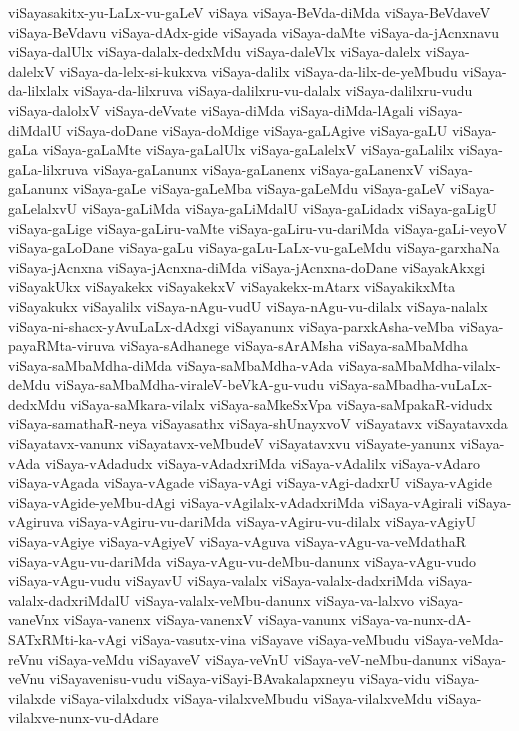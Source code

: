 {viSayasakitx-yu-LaLx-vu-gaLeV
viSaya
viSaya-BeVda-diMda
viSaya-BeVdaveV
viSaya-BeVdavu
viSaya-dAdx-gide
viSayada
viSaya-daMte
viSaya-da-jAcnxnavu
viSaya-dalUlx
viSaya-dalalx-dedxMdu
viSaya-daleVlx
viSaya-dalelx
viSaya-dalelxV
viSaya-da-lelx-si-kukxva
viSaya-dalilx
viSaya-da-lilx-de-yeMbudu
viSaya-da-lilxlalx
viSaya-da-lilxruva
viSaya-dalilxru-vu-dalalx
viSaya-dalilxru-vudu
viSaya-dalolxV
viSaya-deVvate
viSaya-diMda
viSaya-diMda-lAgali
viSaya-diMdalU
viSaya-doDane
viSaya-doMdige
viSaya-gaLAgive
viSaya-gaLU
viSaya-gaLa
viSaya-gaLaMte
viSaya-gaLalUlx
viSaya-gaLalelxV
viSaya-gaLalilx
viSaya-gaLa-lilxruva
viSaya-gaLanunx
viSaya-gaLanenx
viSaya-gaLanenxV
viSaya-gaLanunx
viSaya-gaLe
viSaya-gaLeMba
viSaya-gaLeMdu
viSaya-gaLeV
viSaya-gaLelalxvU
viSaya-gaLiMda
viSaya-gaLiMdalU
viSaya-gaLidadx
viSaya-gaLigU
viSaya-gaLige
viSaya-gaLiru-vaMte
viSaya-gaLiru-vu-dariMda
viSaya-gaLi-veyoV
viSaya-gaLoDane
viSaya-gaLu
viSaya-gaLu-LaLx-vu-gaLeMdu
viSaya-garxhaNa
viSaya-jAcnxna
viSaya-jAcnxna-diMda
viSaya-jAcnxna-doDane
viSayakAkxgi
viSayakUkx
viSayakekx
viSayakekxV
viSayakekx-mAtarx
viSayakikxMta
viSayakukx
viSayalilx
viSaya-nAgu-vudU
viSaya-nAgu-vu-dilalx
viSaya-nalalx
viSaya-ni-shacx-yAvuLaLx-dAdxgi
viSayanunx
viSaya-parxkAsha-veMba
viSaya-payaRMta-viruva
viSaya-sAdhanege
viSaya-sArAMsha
viSaya-saMbaMdha
viSaya-saMbaMdha-diMda
viSaya-saMbaMdha-vAda
viSaya-saMbaMdha-vilalx-deMdu
viSaya-saMbaMdha-viraleV-beVkA-gu-vudu
viSaya-saMbadha-vuLaLx-dedxMdu
viSaya-saMkara-vilalx
viSaya-saMkeSxVpa
viSaya-saMpakaR-vidudx
viSaya-samathaR-neya
viSayasathx
viSaya-shUnayxvoV
viSayatavx
viSayatavxda
viSayatavx-vanunx
viSayatavx-veMbudeV
viSayatavxvu
viSayate-yanunx
viSaya-vAda
viSaya-vAdadudx
viSaya-vAdadxriMda
viSaya-vAdalilx
viSaya-vAdaro
viSaya-vAgada
viSaya-vAgade
viSaya-vAgi
viSaya-vAgi-dadxrU
viSaya-vAgide
viSaya-vAgide-yeMbu-dAgi
viSaya-vAgilalx-vAdadxriMda
viSaya-vAgirali
viSaya-vAgiruva
viSaya-vAgiru-vu-dariMda
viSaya-vAgiru-vu-dilalx
viSaya-vAgiyU
viSaya-vAgiye
viSaya-vAgiyeV
viSaya-vAguva
viSaya-vAgu-va-veMdathaR
viSaya-vAgu-vu-dariMda
viSaya-vAgu-vu-deMbu-danunx
viSaya-vAgu-vudo
viSaya-vAgu-vudu
viSayavU
viSaya-valalx
viSaya-valalx-dadxriMda
viSaya-valalx-dadxriMdalU
viSaya-valalx-veMbu-danunx
viSaya-va-lalxvo
viSaya-vaneVnx
viSaya-vanenx
viSaya-vanenxV
viSaya-vanunx
viSaya-va-nunx-dA-SATxRMti-ka-vAgi
viSaya-vasutx-vina
viSayave
viSaya-veMbudu
viSaya-veMda-reVnu
viSaya-veMdu
viSayaveV
viSaya-veVnU
viSaya-veV-neMbu-danunx
viSaya-veVnu
viSayavenisu-vudu
viSaya-viSayi-BAvakalapxneyu
viSaya-vidu
viSaya-vilalxde
viSaya-vilalxdudx
viSaya-vilalxveMbudu
viSaya-vilalxveMdu
viSaya-vilalxve-nunx-vu-dAdare
}
